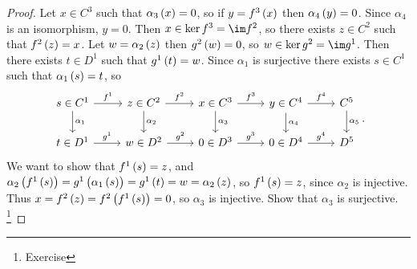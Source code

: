 \begin{proof}
Let $ x \in C^3 $ such that $ \alpha_3\br{x} = 0 $, so if $ y = f^3\br{x} $ then $ \alpha_4\br{y} = 0 $. Since $ \alpha_4 $ is an isomorphism, $ y = 0 $. Then $ x \in \ker f^3 = \im f^2 $, so there exists $ z \in C^2 $ such that $ f^2\br{z} = x $. Let $ w = \alpha_2\br{z} $ then $ g^2\br{w} = 0 $, so $ w \in \ker g^2 = \im g^1 $. Then there exists $ t \in D^1 $ such that $ g^1\br{t} = w $. Since $ \alpha_1 $ is surjective there exists $ s \in C^1 $ such that $ \alpha_1\br{s} = t $, so
$$
\begin{tikzcd}
s \in C^1 \arrow{r}{f^1} \arrow{d}{\alpha_1} & z \in C^2 \arrow{r}{f^2} \arrow{d}{\alpha_2} & x \in C^3 \arrow{r}{f^3} \arrow{d}{\alpha_3} & y \in C^4 \arrow{r}{f^4} \arrow{d}{\alpha_4} & C^5 \arrow{d}{\alpha_5} \\
t \in D^1 \arrow{r}{g^1} & w \in D^2 \arrow{r}{g^2} & 0 \in D^3 \arrow{r}{g^3} & 0 \in D^4 \arrow{r}{g^4} & D^5
\end{tikzcd}.
$$
We want to show that $ f^1\br{s} = z $, and $ \alpha_2\br{f^1\br{s}} = g^1\br{\alpha_1\br{s}} = g^1\br{t} = w = \alpha_2\br{z} $, so $ f^1\br{s} = z $, since $ \alpha_2 $ is injective. Thus $ x = f^2\br{z} = f^2\br{f^1\br{s}} = 0 $, so $ \alpha_3 $ is injective. Show that $ \alpha_3 $ is surjective. \footnote{Exercise}
\end{proof}

\pagebreak


